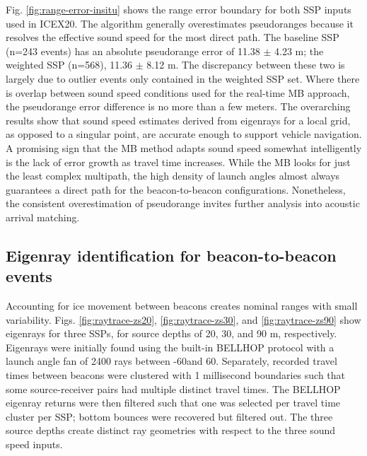 \documentclass[preprint,TurnOnLineNumbers]{JASA}
\newcommand{\llabel}[1]{\hypertarget{llineno:#1}{\linelabel{#1}}}
\begin{document}
Fig. \ref{fig:range-error-insitu} shows the range error boundary for both SSP inputs used in ICEX20.
The algorithm generally overestimates pseudoranges because it resolves the effective sound speed for the most direct path.
\llabel{1.28}
The baseline SSP (n=243 events) has an absolute pseudorange error of 11.38 $\pm$ 4.23 m; the weighted SSP (n=568), 11.36 $\pm$ 8.12 m.
The discrepancy between these two is largely due to outlier events only contained in the weighted SSP set.
Where there is overlap between sound speed conditions used for the real-time MB approach, the pseudorange error difference is no more than a few meters.
The overarching results show that sound speed estimates derived from eigenrays for a local grid, as opposed to a singular point, are accurate enough to support vehicle navigation.
A promising sign that the MB method adapts sound speed somewhat intelligently is the lack of error growth as travel time increases.
While the MB looks for just the least complex multipath, the high density of launch angles almost always guarantees a direct path for the beacon-to-beacon configurations.
Nonetheless, the consistent overestimation of pseudorange invites further analysis into acoustic arrival matching.

\subsection{Eigenray identification for beacon-to-beacon events} \label{sec:eigenrays} \llabel{1.6b}

Accounting for ice movement between beacons creates nominal ranges with small variability.
Figs. \ref{fig:raytrace-zs20}, \ref{fig:raytrace-zs30}, and \ref{fig:raytrace-zs90} show eigenrays for three SSPs, for source depths of 20, 30, and 90 m, respectively.
Eigenrays were initially found using the built-in BELLHOP protocol with a launch angle fan of 2400 rays between -60\textdegree and 60\textdegree.
Separately, recorded travel times between beacons were clustered with 1 millisecond boundaries such that some source-receiver pairs had multiple distinct travel times.
The BELLHOP eigenray returns\llabel{2.8} were then filtered such that one was selected per travel time cluster per SSP; \llabel{1.16} bottom bounces were recovered but filtered out.
The three source depths create distinct ray geometries with respect to the three sound speed inputs.
\end{document}

